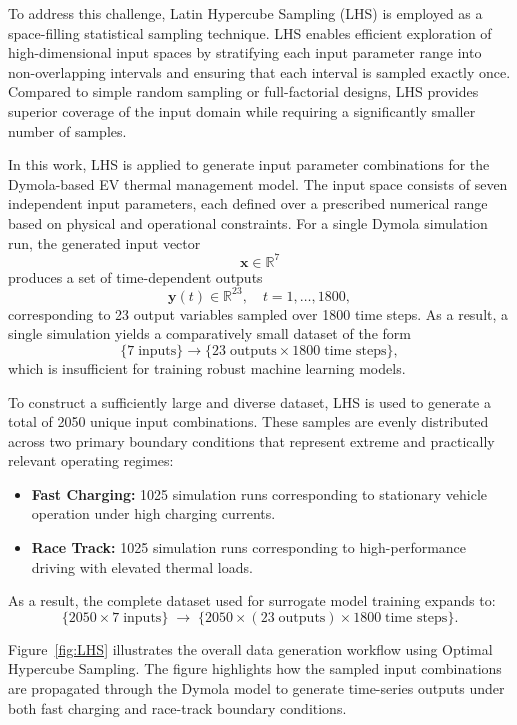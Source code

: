 To address this challenge, Latin Hypercube Sampling (LHS) is employed as a space-filling statistical sampling technique. LHS enables efficient exploration of high-dimensional input spaces by stratifying each input parameter range into non-overlapping intervals and ensuring that each interval is sampled exactly once. Compared to simple random sampling or full-factorial designs, LHS provides superior coverage of the input domain while requiring a significantly smaller number of samples.

In this work, LHS is applied to generate input parameter combinations for the Dymola-based EV thermal management model. The input space consists of seven independent input parameters, each defined over a prescribed numerical range based on physical and operational constraints. For a single Dymola simulation run, the generated input vector
\[
\mathbf{x} \in \mathbb{R}^{7}
\]
produces a set of time-dependent outputs
\[
\mathbf{y}(t) \in \mathbb{R}^{23}, \quad t = 1, \ldots, 1800,
\]
corresponding to 23 output variables sampled over 1800 time steps. As a result, a single simulation yields a comparatively small dataset of the form
\[
\{ 7 \; \text{inputs} \} \rightarrow \{ 23 \; \text{outputs} \times 1800 \; \text{time steps} \},
\]
which is insufficient for training robust machine learning models.

To construct a sufficiently large and diverse dataset, LHS is used to generate a total of 2050 unique input combinations. These samples are evenly distributed across two primary boundary conditions that represent extreme and practically relevant operating regimes:
\begin{itemize}
    \item \textbf{Fast Charging:} 1025 simulation runs corresponding to stationary vehicle operation under high charging currents.
    \item \textbf{Race Track:} 1025 simulation runs corresponding to high-performance driving with elevated thermal loads.
\end{itemize}

As a result, the complete dataset used for surrogate model training expands to:
\[
\{ 2050 \times 7 \; \text{inputs} \}
\;\rightarrow\;
\{ 2050 \times (23 \; \text{outputs}) \times 1800 \; \text{time steps} \}.
\]

Figure~\ref{fig:LHS} illustrates the overall data generation workflow using Optimal Hypercube Sampling. The figure highlights how the sampled input combinations are propagated through the Dymola model to generate time-series outputs under both fast charging and race-track boundary conditions.

